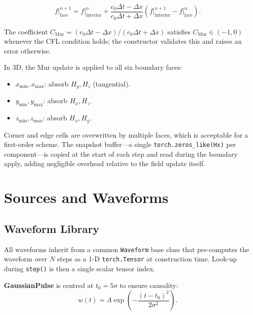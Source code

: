 \documentclass[10pt,twocolumn]{article}
\begin{document}
\begin{equation}
  f\big|_\text{face}^{n+1} = f\big|_\text{interior}^{n}
    + \frac{c_0 \Delta t - \Delta x}{c_0 \Delta t + \Delta x}
      \left(f\big|_\text{interior}^{n+1} - f\big|_\text{face}^n\right).
  \label{eq:mur}
\end{equation}

The coefficient $C_\text{Mur} = (c_0\Delta t - \Delta x)/(c_0\Delta t + \Delta x)$
satisfies $C_\text{Mur} \in (-1, 0)$ whenever the CFL condition holds;
the constructor validates this and raises an error otherwise.

In 3D, the Mur update is applied to all six boundary faces:

\begin{itemize}
  \item $x_\text{min}, x_\text{max}$: absorb $H_y, H_z$ (tangential).
  \item $y_\text{min}, y_\text{max}$: absorb $H_x, H_z$.
  \item $z_\text{min}, z_\text{max}$: absorb $H_x, H_y$.
\end{itemize}

Corner and edge cells are overwritten by multiple faces, which is
acceptable for a first-order scheme. The snapshot buffer—a single
\texttt{torch.zeros\_like(Hx)} per component—is copied at the start of each
step and read during the boundary apply, adding negligible overhead relative
to the field update itself.

\section{Sources and Waveforms}
\label{sec:sources}

\subsection{Waveform Library}

All waveforms inherit from a common \texttt{Waveform} base class that
pre-computes the waveform over $N$ steps as a 1-D \texttt{torch.Tensor}
at construction time. Look-up during \texttt{step()} is then a single
scalar tensor index.

\textbf{GaussianPulse} is centred at $t_0 = 5\sigma$ to ensure causality:
\begin{equation}
  w(t) = A \exp\!\left(-\frac{(t - t_0)^2}{2\sigma^2}\right).
\end{equation}
\end{document}

